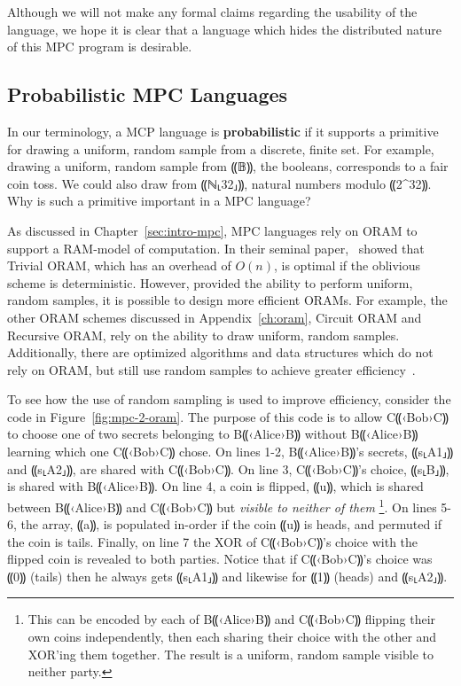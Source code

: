 \documentclass{report}
\newcommand{\alice}{B⸨‹Alice›B⸩\xspace}
\newcommand{\bob}{C⸨‹Bob›C⸩\xspace}
\begin{document}
Although we will not make any formal claims regarding the usability of the language, we hope it is clear that a language which hides the
distributed nature of this MPC program is desirable.

\subsection{Probabilistic MPC Languages}
\label{subsec:background-properties-probabilistic}

In our terminology, a MCP language is \textbf{probabilistic} if it supports a primitive for drawing a uniform, random sample from a
discrete, finite set. For example, drawing a uniform, random sample from ⸨𝔹⸩, the booleans, corresponds to a fair coin toss. We
could also draw from ⸨ℕ⸤32⸥⸩, natural numbers modulo ⸨2^{32}⸩. Why is such a primitive important in a MPC language?

As discussed in Chapter~\ref{sec:intro-mpc}, MPC languages rely on ORAM to support a RAM-model of computation. In their seminal paper,~\citet{}
showed that Trivial ORAM, which has an overhead of $O(n)$, is optimal if the oblivious scheme is deterministic. However, provided the ability
to perform uniform, random samples, it is possible to design more efficient ORAMs. For example, the other ORAM schemes discussed in
Appendix~\ref{ch:oram}, Circuit ORAM and Recursive ORAM, rely on the ability to draw uniform, random samples. Additionally, there are
optimized algorithms and data structures which do not rely on ORAM, but still use random samples to achieve greater efficiency~\cite{}.

To see how the use of random sampling is used to improve efficiency, consider the code in Figure~\ref{fig:mpc-2-oram}. The purpose of
this code is to allow \bob to choose one of two secrets belonging to \alice without \alice learning which one \bob chose. On lines 1-2,
\alice's secrets, ⸨s⸤A1⸥⸩ and ⸨s⸤A2⸥⸩, are shared with \bob. On line 3, \bob's choice, ⸨s⸤B⸥⸩, is shared with \alice.
On line 4, a coin is flipped, ⸨u⸩, which is shared between \alice and \bob but \emph{visible to neither of them}
\footnote{This can be encoded by each of \alice and \bob flipping their own coins independently, then each sharing their choice with the other
  and XOR'ing them together. The result is a uniform, random sample visible to neither party.}. On lines 5-6, the array, ⸨a⸩, is populated
in-order if the coin ⸨u⸩ is heads, and permuted if the coin is tails. Finally, on line 7 the XOR of \bob's choice with the flipped
coin is revealed to both parties. Notice that if \bob's choice was ⸨0⸩ (tails) then he always gets ⸨s⸤A1⸥⸩ and
likewise for ⸨1⸩ (heads) and ⸨s⸤A2⸥⸩.
\end{document}
